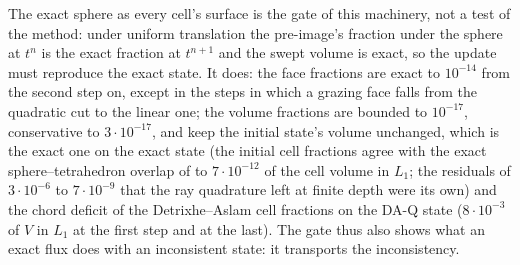 \documentclass[preprint,12pt]{elsarticle}
\begin{document}
The exact sphere as every cell's surface is the gate of this machinery, not a test of the method: under uniform translation the pre-image's fraction under the sphere at $t^n$ is the exact fraction at $t^{n+1}$ and the swept volume is exact, so the update must reproduce the exact state. It does: the face fractions are exact to $10^{-14}$ from the second step on, except in the steps in which a grazing face falls from the quadratic cut to the linear one; the volume fractions are bounded to $10^{-17}$, conservative to $3\cdot10^{-17}$, and keep the initial state's volume unchanged, which is the exact one on the exact state (the initial cell fractions agree with the exact sphere--tetrahedron overlap of \citet{StroblFormellaPoeschel2016} to $7\cdot10^{-12}$ of the cell volume in $L_1$; the residuals of $3\cdot10^{-6}$ to $7\cdot10^{-9}$ that the ray quadrature left at finite depth were its own) and the chord deficit of the Detrixhe--Aslam cell fractions on the DA-Q state ($8\cdot10^{-3}$ of $V$ in $L_1$ at the first step and at the last). The gate thus also shows what an exact flux does with an inconsistent state: it transports the inconsistency.
\end{document}
